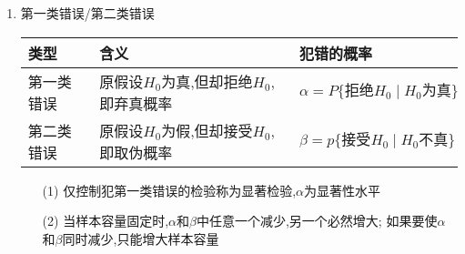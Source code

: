 \documentclass[12pt, a4paper, oneside, UTF8]{ctexbook}
\begin{document}
\begin{remark}[区间估计与假设检验]
\begin{enumerate}
        \item 第一类错误/第二类错误
        \begin{center}
            \begin{tabular}{|p{2.5cm}|p{6cm}|p{5cm}|}
                \hline
                类型 & 含义 & 犯错的概率  \\
                \hline
                第一类错误 & 原假设$H_0$为真,但却拒绝$H_0$,即弃真概率 & 
                $\alpha=P\{\text{拒绝}H_0\mid H_0\text{为真}\}$ \\
                \hline
                第二类错误 & 原假设$H_0$为假,但却接受$H_0$,即取伪概率 &
                $\beta=p\{\text{接受}H_0\mid H_0\text{不真}\}$  \\
                \hline
            \end{tabular}
        \end{center}
        \begin{enumerate}
            \item [(1)]仅控制犯第一类错误的检验称为显著检验,$\alpha$为显著性水平
            \item [(2)] 当样本容量固定时,$\alpha$和$\beta$中任意一个减少,另一个必然增大;
            如果要使$\alpha$和$\beta$同时减少,只能增大样本容量
        \end{enumerate}
    \end{enumerate}
\end{remark}
\ifx\allfiles\undefined
\end{document}
